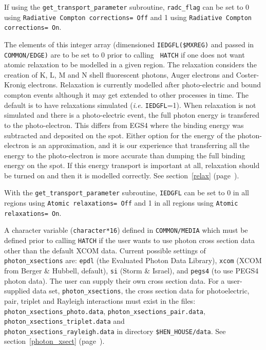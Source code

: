 \begin{description}
If using the {\tt get\_transport\_parameter} subroutine, {\tt radc\_flag}
can be set to 0 using {\tt Radiative Compton corrections= Off} and 1 using
{\tt Radiative Compton corrections= On}.

\item[IEDGFL] The elements of this integer array (dimensioned {\tt IEDGFL(\$MXREG)}
and passed in\\ {\tt COMMON/EDGE)} are to be set to 0 prior to calling {\tt
HATCH}
if one does not want atomic relaxation to be modelled in a given region. The
relaxation considers the creation of K, L, M and N shell fluorescent
photons, Auger electrons and Coster-Kronig electrons.  Relaxation is
currently modelled after photo-electric and bound compton events although
it may get extended to other processes in time. The default is to
have relaxations simulated ({\em i.e.} {\tt IEDGFL}=1).  When relaxation is not simulated and there
is a photo-electric event, the full photon energy is transfered to the
photo-electron.  This differs from EGS4 where the binding energy was
subtracted and deposited on the spot.  Either option for the energy of the
photon-electron is an approximation, and
it is our experience that transferring all the energy to the photo-electron
is more accurate than dumping the full binding energy on the spot.  If this
energy transport is important at all, relaxation should be turned on and
then it is modelled correctly. See section~\ref{relax}
(page~\pageref{relax}).

With the {\tt get\_transport\_parameter} subroutine, {\tt IEDGFL} can be set
to 0 in all regions using {\tt Atomic relaxations= Off} and 1 in all
regions using {\tt Atomic relaxations= On}.

\label{photon_xsections_description}
\item[photon\_xsections] A character variable ({\tt character*16}) defined
in {\tt COMMON/MEDIA} which must be defined prior to calling {\tt HATCH}
if the user wants to use photon cross section data other than the default
XCOM data. Current possible settings of
{\tt photon\_xsections} are: {\tt epdl} (the Evaluated Photon Data
Library\cite{Cu90}), {\tt xcom} (XCOM from Berger \& Hubbell\cite{BH87}, default),
{\tt si} (Storm \& Israel),
and {\tt pegs4} (to use PEGS4 photon data).
The user can supply their own cross section data.  For a user-supplied data
set, {\tt photon\_xsections}, the cross section data for photoelectric,
pair, triplet and Rayleigh interactions must exist in the files:
{\tt photon\_xsections\_photo.data}, {\tt photon\_xsections\_pair.data},
{\tt photon\_xsections\_triplet.data} and\\
 {\tt photon\_xsections\_rayleigh.data}
in directory {\tt \$HEN\_HOUSE/data}.  See section~\ref{photon_xsect}
(page~\pageref{photon_xsect}).


\end{description}
